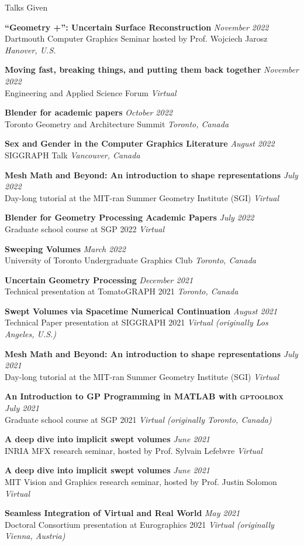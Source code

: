 \documentclass{resume}
\newcommand{\talk}[4]{
    {\bf #1} \hfill {\em \small #2} \\ %
    {\small #3} \hfill {\em \small #4}
}
\begin{document}
\begin{rSection}{Talks Given}

\talk{``Geometry +'': Uncertain Surface Reconstruction}{November 2022}{Dartmouth Computer Graphics Seminar hosted by Prof. Wojciech Jarosz}{Hanover, U.S.}

\talk{Moving fast, breaking things, and putting them back together}{November 2022}{Engineering and Applied Science Forum}{Virtual}

\talk{Blender for academic papers}{October 2022}{Toronto Geometry and Architecture Summit}{Toronto, Canada}

\talk{Sex and Gender in the Computer Graphics Literature}{August 2022}{SIGGRAPH Talk}{Vancouver, Canada}

\talk{Mesh Math and Beyond: An introduction to shape representations}{July 2022}{Day-long tutorial at the MIT-ran Summer Geometry Institute (SGI)}{Virtual}

\talk{Blender for Geometry Processing Academic Papers}{July 2022}{Graduate school course at SGP 2022}{Virtual}

\talk{Sweeping Volumes}{March 2022}
{University of Toronto Undergraduate Graphics Club}{Toronto, Canada}

\talk{Uncertain Geometry Processing}{December 2021}
{Technical presentation at TomatoGRAPH 2021}{Toronto, Canada}

\talk{Swept Volumes via Spacetime Numerical Continuation}{August 2021}
{Technical Paper presentation at SIGGRAPH 2021}{Virtual (originally Los Angeles, U.S.)}

\talk{Mesh Math and Beyond: An introduction to shape representations}{July 2021}
{Day-long tutorial at the MIT-ran Summer Geometry Institute (SGI)}{Virtual}

\talk{An Introduction to GP Programming in MATLAB with \textsc{gptoolbox}}{July 2021}
{Graduate school course at SGP 2021}{Virtual (originally Toronto, Canada)}

\talk{A deep dive into implicit swept volumes}{June 2021}
{INRIA MFX research seminar, hosted by Prof. Sylvain Lefebvre}{Virtual}

\talk{A deep dive into implicit swept volumes}{June 2021}
{MIT Vision and Graphics research seminar, hosted by Prof. Justin Solomon}{Virtual}

\talk{Seamless Integration of Virtual and Real World}{May 2021}
{Doctoral Consortium presentation at Eurographics 2021}{Virtual (originally Vienna, Austria)}


\end{rSection}
\end{document}
